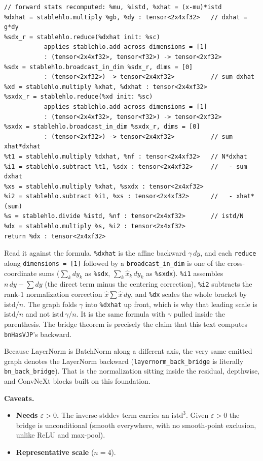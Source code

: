 \begin{verbatim}
// forward stats recomputed: %mu, %istd, %xhat = (x-mu)*istd
%dxhat = stablehlo.multiply %gb, %dy : tensor<2x4xf32>   // dxhat = g*dy
%sdx_r = stablehlo.reduce(%dxhat init: %sc)
           applies stablehlo.add across dimensions = [1]
           : (tensor<2x4xf32>, tensor<f32>) -> tensor<2xf32>
%sdx = stablehlo.broadcast_in_dim %sdx_r, dims = [0]
           : (tensor<2xf32>) -> tensor<2x4xf32>          // sum dxhat
%xd = stablehlo.multiply %xhat, %dxhat : tensor<2x4xf32>
%sxdx_r = stablehlo.reduce(%xd init: %sc)
           applies stablehlo.add across dimensions = [1]
           : (tensor<2x4xf32>, tensor<f32>) -> tensor<2xf32>
%sxdx = stablehlo.broadcast_in_dim %sxdx_r, dims = [0]
           : (tensor<2xf32>) -> tensor<2x4xf32>          // sum xhat*dxhat
%t1 = stablehlo.multiply %dxhat, %nf : tensor<2x4xf32>   // N*dxhat
%i1 = stablehlo.subtract %t1, %sdx : tensor<2x4xf32>     //   - sum dxhat
%xs = stablehlo.multiply %xhat, %sxdx : tensor<2x4xf32>
%i2 = stablehlo.subtract %i1, %xs : tensor<2x4xf32>      //   - xhat*(sum)
%s = stablehlo.divide %istd, %nf : tensor<2x4xf32>       // istd/N
%dx = stablehlo.multiply %s, %i2 : tensor<2x4xf32>
return %dx : tensor<2x4xf32>
\end{verbatim}

\noindent Read it against the formula. \texttt{\%dxhat} is the affine
backward $\gamma\,dy$, and each \texttt{reduce} along \texttt{dimensions = [1]}
followed by a \texttt{broadcast\_in\_dim} is one of the cross-coordinate
sums ($\sum_k dy_k$ as \texttt{\%sdx}, $\sum_k\hat{x}_k\,dy_k$ as
\texttt{\%sxdx}). \texttt{\%i1} assembles $n\,dy - \sum dy$ (the direct term
minus the centering correction), \texttt{\%i2} subtracts the rank-1
normalization correction $\hat{x}\sum\hat{x}\,dy$, and \texttt{\%dx} scales
the whole bracket by $\mathrm{istd}/n$. The graph folds $\gamma$ into
\texttt{\%dxhat} up front, which is why that leading scale is
$\mathrm{istd}/n$ and not $\mathrm{istd}\,\gamma/n$. It is the same
formula with $\gamma$ pulled inside the parenthesis. The bridge theorem is
precisely the claim that this text computes \texttt{bnHasVJP}'s backward.

\medskip\noindent Because LayerNorm is BatchNorm along a different axis, the
very same emitted graph denotes the LayerNorm backward
(\texttt{layernorm\_back\_bridge} is literally \texttt{bn\_back\_bridge}).
That is the normalization sitting inside the residual, depthwise, and
ConvNeXt blocks built on this foundation.

\medskip\noindent\textbf{Caveats.}
\begin{itemize}
  \item \textbf{Needs $\varepsilon > 0$.} The inverse-stddev term carries an
    $\mathrm{istd}^3$. Given $\varepsilon > 0$ the bridge is unconditional
    (smooth everywhere, with no smooth-point exclusion, unlike ReLU and
    max-pool).
  \item \textbf{Representative scale} ($n = 4$).
\end{itemize}

